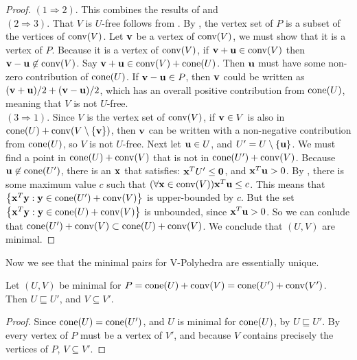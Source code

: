 \begin{proof}
	$(1 \Rightarrow 2)$.  This combines the results of  and \\
	$(2 \Rightarrow 3)$.  That $V$ is $U$-free follows from .  By , the vertex set of $P$ is a subset of the vertices of $\operatorname{conv}(V)$.  Let $\mathbf{v}$ be a vertex of $\operatorname{conv}(V)$, we must show that it is a vertex of $P$.  Because it is a vertex of $\operatorname{conv}(V)$, if $\mathbf{v}+\mathbf{u}\in\operatorname{conv}(V)$ then $\mathbf{v}-\mathbf{u}\not\in\operatorname{conv}(V)$.  Say $\mathbf{v}+\mathbf{u}\in\operatorname{conv}(V)+\operatorname{cone}(U)$.  Then $\mathbf{u}$ must have some non-zero contribution of $\operatorname{cone}(U)$.  If $\mathbf{v}-\mathbf{u}\in P$, then $\mathbf{v}$ could be written as $(\mathbf{v}+\mathbf{u})/2 + (\mathbf{v}-\mathbf{u})/2$, which has an overall positive contribution from $\operatorname{cone}(U)$, meaning that $V$ is not $U$-free.\\
	$(3 \Rightarrow 1)$.  Since $V$ is the vertex set of $\operatorname{conv}(V)$, if $\mathbf{v}\in V$ is also in $\operatorname{cone}(U) + \operatorname{conv}(V\setminus\left\{\mathbf{v}\right\})$, then $\mathbf{v}$ can be written with a non-negative contribution from $\operatorname{cone}(U)$, so $V$ is not $U$-free.  Next let $\mathbf{u}\in U$, and $U'=U\setminus\left\{\mathbf{u}\right\}$.  We must find a point in $\operatorname{cone}(U) + \operatorname{conv}(V)$ that is not in $\operatorname{cone}(U') + \operatorname{conv}(V)$.  Because $\mathbf{u} \not\in\operatorname{cone}(U')$, there is an $\mathbf{x}$ that satisfies: $\mathbf{x}^T U' \leq \mathbf{0}$, and $\mathbf{x}^T \mathbf{u} > 0$.  By , there is some maximum value $c$ such that $(\forall \mathbf{x}\in\operatorname{conv}(V)) \mathbf{x}^T \mathbf{u} \leq c$.  This means that $\left\{\mathbf{x}^T \mathbf{y} : \mathbf{y} \in \operatorname{cone}(U') + \operatorname{conv}(V)\right\}$ is upper-bounded by $c$.  But the set $\left\{\mathbf{x}^T \mathbf{y} : \mathbf{y} \in \operatorname{cone}(U) + \operatorname{conv}(V)\right\}$ is unbounded, since $\mathbf{x}^T \mathbf{u} > 0$.  So we can conlude that $\operatorname{cone}(U') + \operatorname{conv}(V) \subset \operatorname{cone}(U) + \operatorname{conv}(V)$.  We conclude that $(U,V)$ are minimal.
\end{proof}

Now we see that the minimal pairs for V-Polyhedra are essentially unique.

\begin{Prop}
	Let $(U,V)$ be minimal for $P = \operatorname{cone}(U) + \operatorname{conv}(V) = \operatorname{cone}(U') + \operatorname{conv}(V')$.  Then $U\sqsubseteq U'$, and $V\subseteq V'$.
\end{Prop}

\begin{proof}
	Since $\operatorname{cone}(U) = \operatorname{cone}(U')$, and $U$ is minimal for $\operatorname{cone}(U)$, by  $U\sqsubseteq U'$.  By  every vertex of $P$ must be a vertex of $V'$, and because $V$ contains precisely the vertices of $P$, $V\subseteq V'$.
\end{proof}

